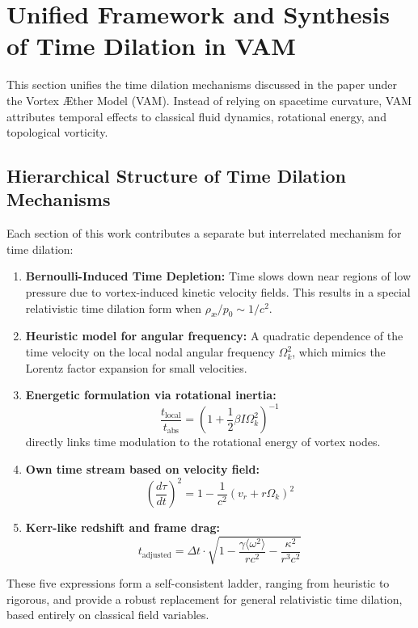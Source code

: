 \section{Unified Framework and Synthesis of Time Dilation in VAM}

This section unifies the time dilation mechanisms discussed in the paper under the Vortex Æther Model (VAM). Instead of relying on spacetime curvature, VAM attributes temporal effects to classical fluid dynamics, rotational energy, and topological vorticity.

\subsection{Hierarchical Structure of Time Dilation Mechanisms}

Each section of this work contributes a separate but interrelated mechanism for time dilation:

\begin{enumerate}
    \item \textbf{Bernoulli-Induced Time Depletion:} Time slows down near regions of low pressure due to vortex-induced kinetic velocity fields. This results in a special relativistic time dilation form when \( \rho_{\text{\ae}} / p_0 \sim 1/c^2 \).
    \item \textbf{Heuristic model for angular frequency:} A quadratic dependence of the time velocity on the local nodal angular frequency \( \Omega_k^2 \), which mimics the Lorentz factor expansion for small velocities.
    \item \textbf{Energetic formulation via rotational inertia:}
    \[
        \boxed{\frac{t_{\text{local}}}{t_{\text{abs}}} = \left(1 + \frac{1}{2} \beta I \Omega_k^2 \right)^{-1}}
    \]
    directly links time modulation to the rotational energy of vortex nodes. \item \textbf{Own time stream based on velocity field:}
    \[
        \boxed{\left( \frac{d\tau}{dt} \right)^2 = 1 - \frac{1}{c^2}(v_r + r\Omega_k)^2}
    \]
    \item \textbf{Kerr-like redshift and frame drag:}
    \[
        \boxed{t_{\text{adjusted}} = \Delta t \cdot \sqrt{1 - \frac{\gamma \langle \omega^2 \rangle}{rc^2} - \frac{\kappa^2}{r^3c^2}}}
    \]
\end{enumerate}

These five expressions form a self-consistent ladder, ranging from heuristic to rigorous, and provide a robust replacement for general relativistic time dilation, based entirely on classical field variables.

